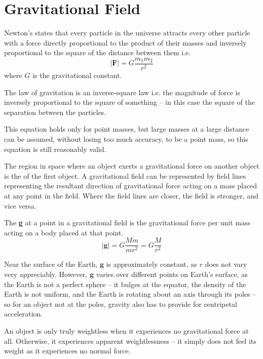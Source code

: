 \documentclass[Physics.tex]{subfiles}
\begin{document}
\chapter{Gravitational Field}
Newton's  states that every particle in the universe attracts every other particle with a force directly proportional to the product of their masses and inversely proportional to the square of the distance between them i.e. \begin{equation}\left|\mathbf{F}\right| = G\frac{m_{1}m_{2}}{r^{2}}\end{equation} where \(G\) is the gravitational constant.

The law of gravitation is an inverse-square law i.e. the magnitude of force is inversely proportional to the square of something -- in this case the square of the separation between the particles.

This equation holds only for point masses, but large masses at a large distance can be assumed, without losing too much accuracy, to be a point mass, so this equation is still reasonably valid.

The region in space where an object exerts a gravitational force on another object is the  of the first object. A gravitational field can be represented by field lines representing the resultant direction of gravitational force acting on a mass placed at any point in the field. Where the field lines are closer, the field is stronger, and vice versa.

The  \textbf{g} at a point in a gravitational field is the gravitational force per unit mass acting on a body placed at that point. \begin{equation}\left|\mathbf{g}\right| = G\frac{Mm}{mr^{2}} = G\frac{M}{r^{2}}\end{equation}

Near the surface of the Earth, \(\mathbf{g}\) is approximately constant, as \(r\) does not vary very appreciably. However, \(\mathbf{g}\) varies over different points on Earth's surface, as the Earth is not a perfect sphere -- it bulges at the equator, the density of the Earth is not uniform, and the Earth is rotating about an axis through its poles -- so for an object not at the poles, gravity also has to provide for centripetal acceleration.

An object is only truly weightless when it experiences no gravitational force at all. Otherwise, it experiences apparent weightlessness -- it simply does not feel its weight as it experiences no normal force.
\end{document}

